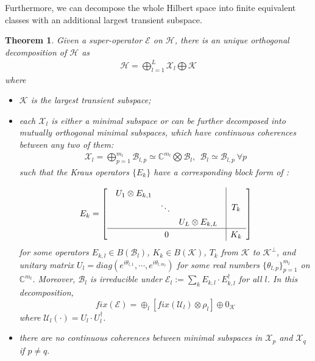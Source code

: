 \documentclass[journal]{IEEEtran}
\def\h{\ensuremath{\mathcal{H}}}
\def\u{\ensuremath{\mathcal{U}}}
\def\k{\ensuremath{\mathcal{K}}}
\def\u{\ensuremath{\mathcal{U}}}
\def\x{\ensuremath{\mathcal{X}}}
\def\b{\ensuremath{\mathcal{B}}}
\def\e{\ensuremath{\mathcal{E}}}
\def\k{\mathcal{K}}
\newtheorem{theorem}{Theorem}
\begin{document}
Furthermore, we can decompose the whole Hilbert space into finite equivalent classes  with an additional largest transient subspace. 
\begin{theorem}\label{Theo_CC_dec}
  Given a super-operator $\e$ on $\h$, there is an unique  orthogonal decomposition of $\h$ as
  \begin{eqnarray}\label{Eq_unique}
    \h=\bigoplus_{l=1}^L\x_l\bigoplus \k
  \end{eqnarray}
  where \begin{itemize}
    \item[(1)] $\k$ is the largest transient subspace;
    \item[(2)] each $\x_l$ is either a minimal subspace or can be further decomposed into mutually orthogonal minimal subspaces, which have continuous coherences between any two of them:
    \begin{eqnarray}\label{Eq_dec_CC}
      \x_l=\bigoplus_{p=1}^{m_l}\b_{l,p}\simeq\mathbb{C}^{m_l}\bigotimes \b_l, \ \ \b_l\simeq \b_{l,p} \ \forall p
    \end{eqnarray} 
    such that the Kraus operators $\{E_k\}$ have a corresponding block form of :
  
     \begin{eqnarray}\label{Eq_CC_dec_Kraus}
    \renewcommand{\arraystretch}{1.2}
E_k=\left[\begin{array}{c|c}
  \begin{array}{ccc}
  U_{1}\otimes E_{k,1} &  &\\
   & \ddots &\\
   & & U_{L}\otimes E_{k,L}  
  \end{array} & T_k\\
  \hline
0&K_k
\end{array}\right]
  \end{eqnarray}
for some operators $E_{k,l}\in B(\b_l)$, $K_k\in B(\k)$, $T_k$ from $\k$ to $\k^\perp$, and    unitary matrix $U_l=diag(e^{i\theta_{l,1}},\cdots,e^{i\theta_{l,m_l}})$ for some real numbers $\{\theta_{l,p}\}_{p=1}^{m_l}$ on $\mathbb{C}^{m_l}$. Moreover, $\b_l$ is irreducible under $\e_{l}:=\sum_{k}E_{k,l}\cdot E_{k,l}^\dagger$ for all $l$. In this decomposition,
$$fix(\e)=\oplus_l[fix(\u_{l})\otimes \rho_l]\oplus 0_\k$$ 
where $\u_l(\cdot)=U_l\cdot U_l^\dagger$. %
    \item[(3)] there are no continuous coherences between minimal subspaces in $\x_p$ and $\x_q$ if $p\not =q.$
      \end{itemize}
  
\end{theorem}
\end{document}
